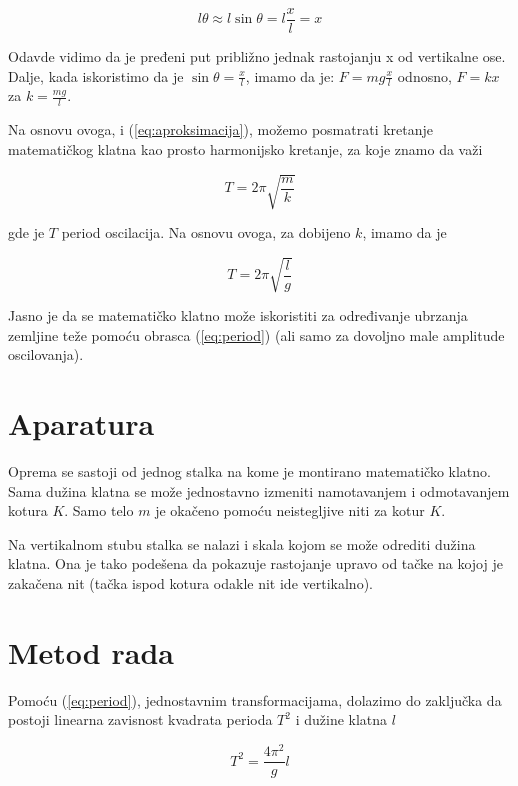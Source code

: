 \begin{equation}
    \label{eq:aproksimacija}
    l\theta \approx l \sin \theta = l \frac{x}{l} = x
\end{equation}

Odavde vidimo da je pređeni put približno jednak rastojanju x od vertikalne ose. Dalje, kada iskoristimo da je $\sin\theta = \frac{x}{l}$, imamo da je: $F = mg \tfrac{x}{l}$ odnosno, $F = kx$ za $k = \tfrac{mg}{l}$.

Na osnovu ovoga, i (\ref{eq:aproksimacija}), možemo posmatrati kretanje matematičkog klatna kao prosto harmonijsko kretanje, za koje znamo da važi

\begin{equation}
    T = 2 \pi \sqrt{\frac{m}{k}}
\end{equation}

gde je $T$ period oscilacija. Na osnovu ovoga, za dobijeno $k$, imamo da je

\begin{equation}
    \label{eq:period}
    T = 2 \pi \sqrt{\frac{l}{g}}
\end{equation}

Jasno je da se matematičko klatno može iskoristiti za određivanje ubrzanja zemljine teže pomoću obrasca (\ref{eq:period}) (ali samo za dovoljno male amplitude oscilovanja).

\section{Aparatura}

Oprema se sastoji od jednog stalka na kome je montirano matematičko klatno. Sama dužina klatna se može jednostavno izmeniti namotavanjem i odmotavanjem kotura $K$. Samo telo $m$ je okačeno pomoću neistegljive niti za kotur $K$.

Na vertikalnom stubu stalka se nalazi i skala kojom se može odrediti dužina klatna. Ona je tako podešena da pokazuje rastojanje upravo od tačke na kojoj je zakačena nit (tačka ispod kotura odakle nit ide vertikalno).

\section{Metod rada}

Pomoću (\ref{eq:period}), jednostavnim transformacijama, dolazimo do zaključka da postoji linearna zavisnost kvadrata perioda $T^2$ i dužine klatna $l$

\begin{equation}
    \label{eq:kvadratperioda}
    T^2 = \frac{4 \pi^2}{g} l
\end{equation}

